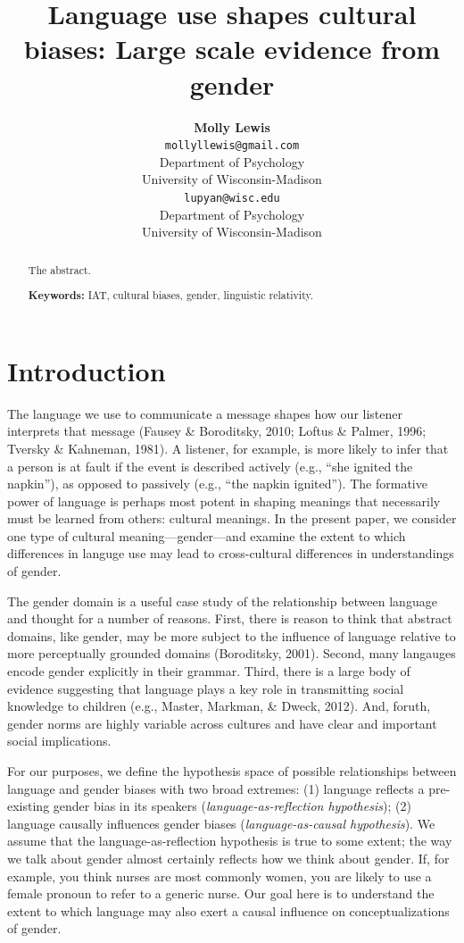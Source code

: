 \documentclass[10pt, letterpaper]{article}
\title{Language use shapes cultural biases: Large scale evidence from gender}
\author{{\large \bf Molly Lewis} \\ \texttt{mollyllewis@gmail.com} \\ Department of Psychology  \\ University of Wisconsin-Madison \And {\large \bf Gary Lupyan} \\ \texttt{lupyan@wisc.edu} \\ Department of Psychology  \\ University of Wisconsin-Madison}
\begin{document}
\maketitle

\begin{abstract}
The abstract.

\textbf{Keywords:}
IAT, cultural biases, gender, linguistic relativity.
\end{abstract}

\section{Introduction}\label{introduction}

The language we use to communicate a message shapes how our listener
interprets that message (Fausey \& Boroditsky, 2010; Loftus \& Palmer,
1996; Tversky \& Kahneman, 1981). A listener, for example, is more
likely to infer that a person is at fault if the event is described
actively (e.g., ``she ignited the napkin''), as opposed to passively
(e.g., ``the napkin ignited''). The formative power of language is
perhaps most potent in shaping meanings that necessarily must be learned
from others: cultural meanings. In the present paper, we consider one
type of cultural meaning---gender---and examine the extent to which
differences in languge use may lead to cross-cultural differences in
understandings of gender.

The gender domain is a useful case study of the relationship between
language and thought for a number of reasons. First, there is reason to
think that abstract domains, like gender, may be more subject to the
influence of language relative to more perceptually grounded domains
(Boroditsky, 2001). Second, many langauges encode gender explicitly in
their grammar. Third, there is a large body of evidence suggesting that
language plays a key role in transmitting social knowledge to children
(e.g., Master, Markman, \& Dweck, 2012). And, foruth, gender norms are
highly variable across cultures and have clear and important social
implications.

For our purposes, we define the hypothesis space of possible
relationships between language and gender biases with two broad
extremes: (1) language reflects a pre-existing gender bias in its
speakers (\emph{language-as-reflection hypothesis}); (2) language
causally influences gender biases (\emph{language-as-causal
hypothesis}). We assume that the language-as-reflection hypothesis is
true to some extent; the way we talk about gender almost certainly
reflects how we think about gender. If, for example, you think nurses
are most commonly women, you are likely to use a female pronoun to refer
to a generic nurse. Our goal here is to understand the extent to which
language may also exert a causal influence on conceptualizations of
gender.
\end{document}
